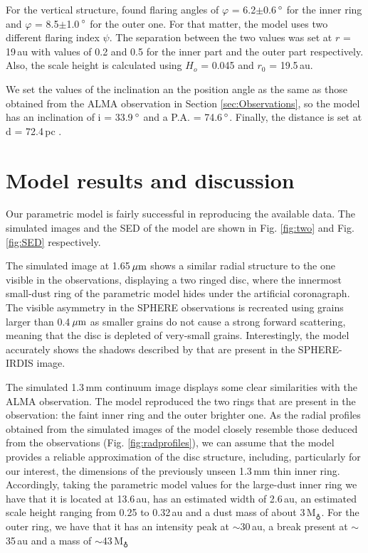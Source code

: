 \documentclass[letters,usenatbib,times]{mnras}
\begin{document}
For the vertical structure, \citet{dOrazi} found flaring angles of $\varphi$ = 6.2$\pm$0.6\,$\hbox{$^\circ$}$ for the inner ring and $\varphi$ = 8.5$\pm$1.0\,$\hbox{$^\circ$}$ for the outer one. For that matter, the model uses two different flaring index $\psi$. The separation between the two values was set at $r$ = 19\,au with values of 0.2 and 0.5 for the inner part and the outer part respectively. Also, the scale height is calculated using $H_o$ = 0.045 and $r_0$ = 19.5\,au.

We set the values of the inclination an the position angle as the same as those obtained from the ALMA observation in Section \ref{sec:Observations}, so the model has an inclination of i = 33.9\,$\hbox{$^\circ$}$ and a P.A. = 74.6\,$\hbox{$^\circ$}$. Finally, the distance is set at d = 72.4\,pc \citep{Gaia}.

\section{Model results and discussion} \label{sec:results}

Our parametric model is fairly successful in reproducing the available data. The simulated images and the SED of the model are shown in Fig. \ref{fig:two} and Fig. \ref{fig:SED} respectively.

The simulated image at 1.65\,$\hbox{$\mu$m}$ shows a similar radial structure to the one visible in the observations, displaying a two ringed disc, where the innermost small-dust ring of the parametric model hides under the artificial coronagraph. The visible asymmetry in the SPHERE observations is recreated using grains larger than 0.4\,$\hbox{$\mu$m}$ as smaller grains do not cause a strong forward scattering, meaning that the disc is depleted of very-small grains. Interestingly, the model accurately shows the shadows described by \citet{dOrazi} that are present in the SPHERE-IRDIS image.

The simulated 1.3\,mm continuum image displays some clear similarities with the ALMA observation. The model reproduced the two rings that are present in the observation: the faint inner ring and the outer brighter one. As the radial profiles obtained from the simulated images of the model closely resemble those deduced from the observations (Fig. \ref{fig:radprofiles}), we can assume that the model provides a reliable approximation of the disc structure, including, particularly for our interest, the dimensions of the previously unseen 1.3\,mm thin inner ring. Accordingly, taking the parametric model values for the large-dust inner ring we have that it is located at 13.6\,au, has an estimated width of 2.6\,au, an estimated scale height ranging from 0.25 to 0.32\,au and a dust mass of about 3\,M$_{\earth}$. For the outer ring, we have that it has an intensity peak at $\sim$30\,au, a break present at $\sim$35\,au and a mass of $\sim$43\,M$_{\earth}$
\end{document}
